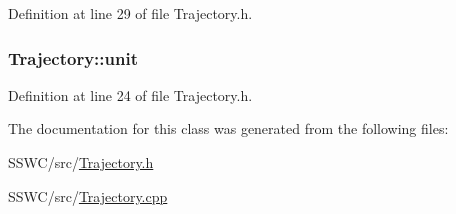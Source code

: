 Definition at line 29 of file Trajectory.\+h.

\hypertarget{class_trajectory_a8d881aa7724623b0a675a7f3cbe118bc}{
\subsubsection[{unit}]{ Trajectory\+::unit\hspace{0.3cm}{\ttfamily [protected]}}}\label{class_trajectory_a8d881aa7724623b0a675a7f3cbe118bc}


Definition at line 24 of file Trajectory.\+h.



The documentation for this class was generated from the following files\+:\begin{DoxyCompactItemize}
\item 
S\+S\+W\+C/src/\hyperlink{_trajectory_8h}{Trajectory.\+h}\item 
S\+S\+W\+C/src/\hyperlink{_trajectory_8cpp}{Trajectory.\+cpp}\end{DoxyCompactItemize}
